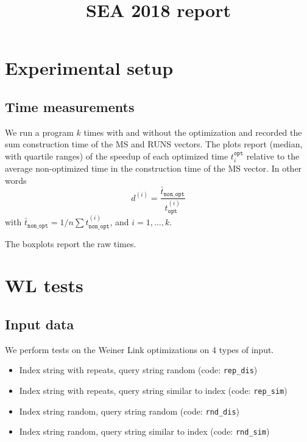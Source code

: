 \documentclass[]{article}
\title{SEA 2018 report}
\author{}
\date{}
\providecommand{\tightlist}{%
  \setlength{\itemsep}{0pt}\setlength{\parskip}{0pt}}
\begin{document}
\maketitle

{
\setcounter{tocdepth}{2}
\tableofcontents
}
\section{Experimental setup}\label{experimental-setup}

\subsection{Time measurements}\label{time-measurements}

We run a program \(k\) times with and without the optimization and
recorded the sum construction time of the MS and RUNS vectors. The plots
report (median, with quartile ranges) of the speedup of each optimized
time \(t_i^{\mathtt{opt}}\) relative to the average non-optimized time
in the construction time of the MS vector. In other words\\
\[
d^{(i)} = \frac{\bar{t}_{\mathtt{non\_opt}}}{t^{(i)}_{\mathtt{opt}}}
\] with
\(\bar{t}_{\mathtt{non\_opt}} = 1/n \sum t^{(i)}_{\mathtt{non\_opt}}\),
and \(i = 1, \ldots, k\).

The boxplots report the raw times.

\section{WL tests}\label{wl-tests}

\subsection{Input data}\label{input-data}

We perform tests on the Weiner Link optimizations on 4 types of input.

\begin{itemize}
\tightlist
\item
  Index string with repeats, query string random (code:
  \texttt{rep\_dis})
\item
  Index string with repeats, query string similar to index (code:
  \texttt{rep\_sim})
\item
  Index string random, query string random (code: \texttt{rnd\_dis})
\item
  Index string random, query string similar to index (code:
  \texttt{rnd\_sim})
\end{itemize}
\end{document}
